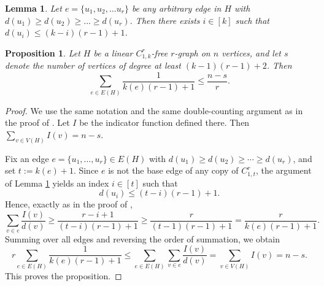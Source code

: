 \documentclass[10pt,a4paper]{amsart}
\newtheorem{lemma}{Lemma}
\newtheorem{proposition}{Proposition}
\begin{document}
\begin{lemma}\label{lem2}
    Let $e = \{u_1,u_2,\dots u_r\}$ be any arbitrary edge in $H$ with $d(u_1) \geq d(u_2) \geq\dots \geq d(u_r)$. Then there exists $i \in [k]$ such that $d(u_i) \leq (k-i)(r-1) +1$.
\end{lemma}

\begin{proposition}\label{weighted}
Let $H$ be a linear $C_{1,k}^r$-free $r$-graph on $n$ vertices, and let $s$ denote the number of vertices of degree at least $(k-1)(r-1)+2$. Then
\[
\sum_{e\in E(H)} \frac{1}{k(e)(r-1)+1} \le \frac{n-s}{r}.
\]
\end{proposition}

\begin{proof}
We use the same notation and the same double-counting argument as in the proof of . Let $I$ be the indicator function defined there. Then
$\sum_{v\in V(H)} I(v)=n-s$.

Fix an edge $e=\{u_1,\dots,u_r\}\in E(H)$ with $d(u_1)\ge d(u_2)\ge \cdots \ge d(u_r)$,
and set $t:=k(e)+1$. Since $e$ is not the base edge of any copy of $C_{1,t}^r$, the argument of Lemma \ref{lem2} yields an index $i\in [t]$ such that
\[
d(u_i)\le (t-i)(r-1)+1.
\]
Hence, exactly as in the proof of ,
\[
\sum_{v\in e}\frac{I(v)}{d(v)}
\ge \frac{r-i+1}{(t-i)(r-1)+1}
\ge \frac{r}{(t-1)(r-1)+1}
= \frac{r}{k(e)(r-1)+1}.
\]
Summing over all edges and reversing the order of summation, we obtain
\[
r\sum_{e\in E(H)}\frac{1}{k(e)(r-1)+1}
\le
\sum_{e\in E(H)}\sum_{v\in e}\frac{I(v)}{d(v)}
=
\sum_{v\in V(H)} I(v)
=
n-s.
\]
This proves the proposition.
\end{proof}
\end{document}
